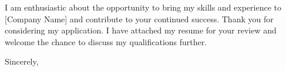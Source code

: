 \documentclass{coverletter}
\begin{document}
I am enthusiastic about the opportunity to bring my skills and experience to [Company Name] and contribute to your continued success. Thank you for considering my application. I have attached my resume for your review and welcome the chance to discuss my qualifications further.


\vspace{0.5cm}

Sincerely,

\makesignature %
\end{document}
